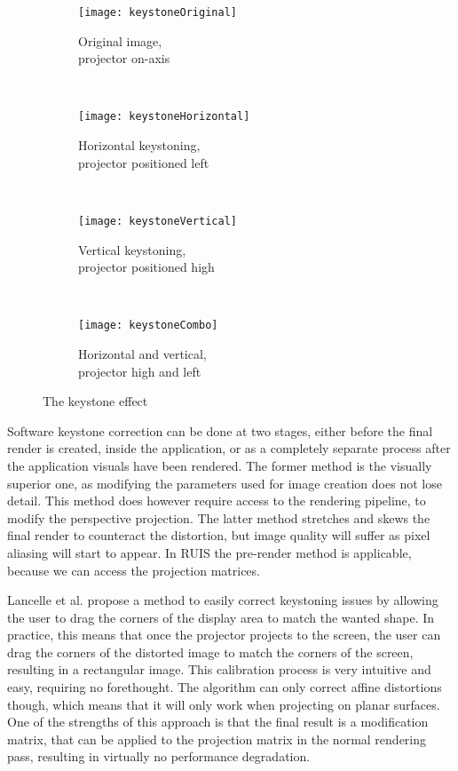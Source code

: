 \documentclass[12pt,a4paper,oneside,pdftex]{report}
\begin{document}
\begin{figure}[h]
    \centering
    \captionsetup{justification=centering}
    \begin{subfigure}{0.4\textwidth}
        \texttt{[image: keystoneOriginal]}
        \caption{Original image,\\projector on-axis}
        \label{subfig:keystoneOriginal}
    \end{subfigure}
    ~
    \begin{subfigure}{0.4\textwidth}
        \texttt{[image: keystoneHorizontal]}
        \caption{Horizontal keystoning,\\projector positioned left}
        \label{subfig:keystoneHorizontal}
    \end{subfigure}
    \\[1em]
    \begin{subfigure}{0.4\textwidth}
        \texttt{[image: keystoneVertical]}
        \caption{Vertical keystoning,\\projector positioned high}
        \label{subfig:keystoneVertical}
    \end{subfigure}
    ~
    \begin{subfigure}{0.4\textwidth}
        \texttt{[image: keystoneCombo]}
        \caption{Horizontal and vertical,\\projector high and left}
        \label{subfig:keystoneCombo}
    \end{subfigure}
    \caption{The keystone effect} \label{fig:keystoneEffect}
\end{figure}

Software keystone correction can be done at two stages, either before the final render is created, inside the application, or as a completely separate process after the application visuals have been rendered. The former method is the visually superior one, as modifying the parameters used for image creation does not lose detail. This method does however require access to the rendering pipeline, to modify the perspective projection. The latter method stretches and skews the final render to counteract the distortion, but image quality will suffer as pixel aliasing will start to appear. In RUIS the pre-render method is applicable, because we can access the projection matrices.

Lancelle et al. \cite{TUGrazKeystoning} propose a method to easily correct keystoning issues by allowing the user to drag the corners of the display area to match the wanted shape. In practice, this means that once the projector projects to the screen, the user can drag the corners of the distorted image to match the corners of the screen, resulting in a rectangular image. This calibration process is very intuitive and easy, requiring no forethought. The algorithm can only correct affine distortions though, which means that it will only work when projecting on planar surfaces. One of the strengths of this approach is that the final result is a modification matrix, that can be applied to the projection matrix in the normal rendering pass, resulting in virtually no performance degradation.
\end{document}
